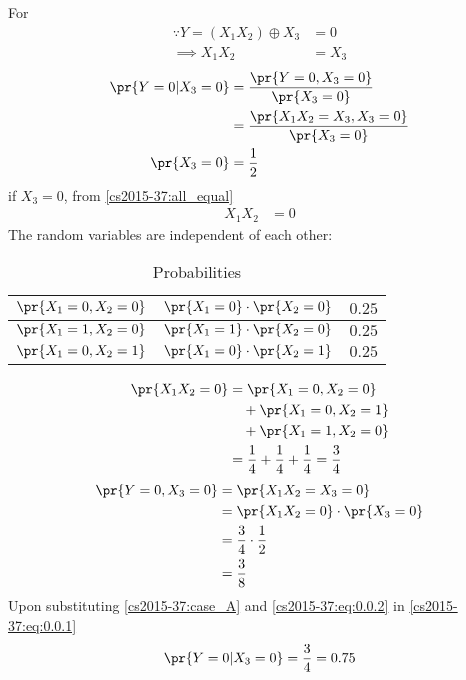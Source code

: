 
For
\begin{align}
    \because Y = (X_1X_2) \oplus X_3 &= 0\\
    \implies X_1X_2 &= X_3 \label{cs2015-37:all_equal}
\end{align}
\begin{align}
    \pr{Y=0|X_3=0} &= \dfrac{\pr{Y=0,X_3=0}}{\pr{X_3=0}} \label{cs2015-37:eq:0.0.1}\\
    &=\dfrac{\pr{X_1X_2 = X_3, X_3 = 0}}{\pr{X_3=0}}\\
    \pr{X_3 = 0} &= \frac{1}{2} \label{cs2015-37:eq:0.0.2}
\end{align}
if $X_3 = 0$, from \eqref{cs2015-37:all_equal}
\begin{align}
    X_1X_2 &= 0
\end{align}
The random variables are independent of each other:
\begin{table}[h!]
    \centering
    \resizebox{\columnwidth}{!}
    {
    \begin{tabular}{|c|c|c|}
    \hline
         $\pr{X_1=0,X_2=0}$& $\pr{X_1=0}\cdot\pr{X_2=0}$&$0.25 $\\ \hline
         
         $\pr{X_1=1,X_2=0}$&$\pr{X_1=1}\cdot\pr{X_2=0}$&$0.25$ \\  \hline
         $\pr{X_1=0,X_2=1}$&$\pr{X_1=0}\cdot\pr{X_2=1}$&$0.25$\\
         \hline
    \end{tabular}
    }
    
    \caption{Probabilities }
    \label{cs2015-37:tab:my_label}
\end{table}
\begin{align}
\nonumber
\pr{X_1X_2=0} &= \pr{X_1=0,X_2=0} \\ \nonumber
    &\quad+ \pr{X_1=0,X_2=1}\\ &\quad+ \pr{X_1=1,X_2=0}\\
    &=\frac{1}{4} +\frac{1}{4} + \frac{1}{4}= \frac{3}{4} 
\end{align}
\begin{align}
    \pr{Y=0,X_3=0} &= \pr{X_1X_2=X_3=0}\\
    &= \pr{X_1X_2=0}\cdot\pr{X_3=0}\\
    &=\frac{3}{4} \cdot \frac{1}{2}\\
    &=\frac{3}{8} \label{cs2015-37:case_A}
\end{align}
Upon substituting \eqref{cs2015-37:case_A} and \eqref{cs2015-37:eq:0.0.2} in \eqref{cs2015-37:eq:0.0.1}
\begin{align}
    \pr{Y=0|X_3=0} = \dfrac{3}{4} = 0.75
\end{align}